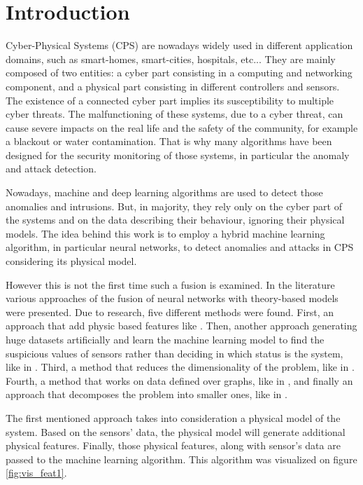 \chapter{Introduction} \label{chap:intro}

Cyber-Physical Systems (CPS) are nowadays widely used in different application domains, such as smart-homes, smart-cities, hospitals, etc... They are mainly composed of two entities: a cyber part consisting in a computing and networking component, and a physical part consisting in different controllers and sensors. The existence of a connected cyber part implies its susceptibility to multiple cyber threats. The malfunctioning of these systems, due to a cyber threat, can cause severe impacts on the real life and the safety of the community, for example a blackout or water contamination. That is why many algorithms have been designed for the security monitoring of those systems, in particular the anomaly and attack detection.

Nowadays, machine and deep learning algorithms are used to detect those anomalies and intrusions. But, in majority, they rely only on the cyber part of the systems and on the data describing their behaviour, ignoring their physical models. The idea behind this work is to employ a hybrid machine learning algorithm, in particular neural networks, to detect anomalies and attacks in CPS considering its physical model.

However this is not the first time such a fusion is examined. In the literature various approaches of the fusion of neural networks with theory-based models were presented. Due to research, five different methods were found. First, an approach that add physic based features like \cite{karpatne_physics-guided_2018}. Then, another approach generating huge datasets artificially and learn the machine learning model to find the suspicious values of sensors rather than deciding in which status is the system, like in \cite{ferragut_real-time_2017}. Third, a method that reduces the dimensionality of the problem, like in \cite{swischuk_projection-based_2019}. Fourth, a method that works on data defined over graphs, like in \cite{zamzam_physics-aware_2019}, and finally an approach that decomposes the problem into smaller ones, like in \cite{karpatne_theory-guided_2017}.

The first mentioned approach takes into consideration a physical model of the system. Based on the sensors' data, the physical model will generate additional physical features. Finally, those physical features, along with sensor's data are passed to the machine learning algorithm. This algorithm was visualized on figure \ref{fig:vis_feat1}.

